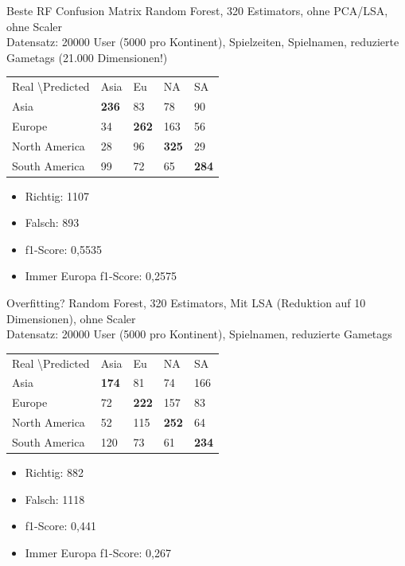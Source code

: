 \documentclass[12pt]{beamer}
\begin{document}
\begin{frame}[fragile]{Beste RF Confusion Matrix}
	Random Forest, 320 Estimators, ohne PCA/LSA, ohne Scaler \\
	Datensatz: 20000 User (5000 pro Kontinent), Spielzeiten, Spielnamen, reduzierte Gametags (21.000 Dimensionen!)\\
	\medskip
	\begin{tabular}{| l| l| l| l| l|}
		\hline
		Real \textbackslash Predicted & Asia & Eu & NA & SA \\
		Asia & \textbf{236} & 83 & 78 & 90 \\
		Europe & 34 & \textbf{262} & 163 & 56 \\
		North America & 28 & 96 & \textbf{325} & 29 \\
		South America & 99 & 72 & 65 & \textbf{284} \\
		\hline
	\end{tabular}
	\begin{multicols}{2}
		\begin{itemize}
			\item Richtig: 1107
			\item Falsch: 893
			\medskip			
			\item f1-Score: 0,5535
			\item Immer Europa f1-Score: 0,2575
		\end{itemize}
	\end{multicols}
\end{frame}

\begin{frame}[fragile]{Overfitting?}
	Random Forest, 320 Estimators, Mit LSA (Reduktion auf 10 Dimensionen), ohne Scaler \\
	Datensatz: 20000 User (5000 pro Kontinent), Spielnamen, reduzierte Gametags \\
	\medskip
	\begin{tabular}{| l| l| l| l| l|}
		\hline
		Real \textbackslash Predicted & Asia & Eu & NA & SA \\
		Asia & \textbf{174} & 81 & 74 & 166 \\
		Europe & 72 & \textbf{222} & 157 & 83 \\
		North America & 52 & 115 & \textbf{252} & 64 \\
		South America & 120 & 73 & 61 & \textbf{234} \\
		\hline
	\end{tabular}
	\begin{multicols}{2}
		\begin{itemize}
			\item Richtig: 882
			\item Falsch: 1118
			\medskip
			\item f1-Score: 0,441
			\item Immer Europa f1-Score: 0,267
		\end{itemize}
	\end{multicols}
\end{frame}
\end{document}
